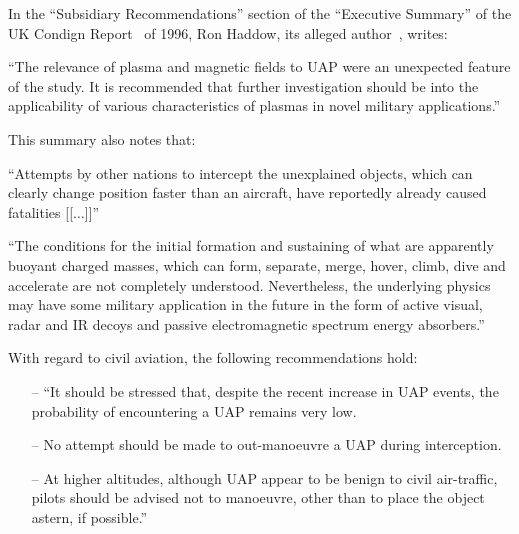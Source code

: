 In the ``Subsidiary Recommendations'' section of the ``Executive Summary'' of the UK Condign Report~\cite{CondignReport} of 1996,
Ron Haddow, its alleged author~\cite{Clarke2022Nov}, writes:
\begin{svgraybox}
``The relevance of plasma and magnetic fields to UAP were an unexpected feature of
the study. It is recommended that further investigation should be into the
applicability of various characteristics of plasmas in novel military applications.''
\end{svgraybox}

This summary also notes that:
\begin{svgraybox}
``Attempts by other nations to intercept the unexplained objects, which can
clearly change position faster than an aircraft, have reportedly already caused
fatalities  [[$\ldots$]]''

 ``The conditions for the initial formation and sustaining of what are apparently
buoyant charged masses, which can form, separate, merge, hover, climb, dive and
accelerate are not completely understood. Nevertheless, the underlying physics may
have some military application in the future in the form of active visual, radar and IR
decoys and passive electromagnetic spectrum energy absorbers.''
\end{svgraybox}

With regard to civil aviation, the following recommendations hold:
\begin{svgraybox}
\begin{itemize}
\item[--] ``It should be stressed that, despite the recent increase in UAP events, the
probability of encountering a UAP remains very low.
\item[--]  No attempt should be made to out-manoeuvre a UAP during interception.
\item[--]  At higher altitudes, although UAP appear to be benign to civil air-traffic,
pilots should be advised not to manoeuvre, other than to place the object
astern, if possible.''
\end{itemize}
\end{svgraybox}

